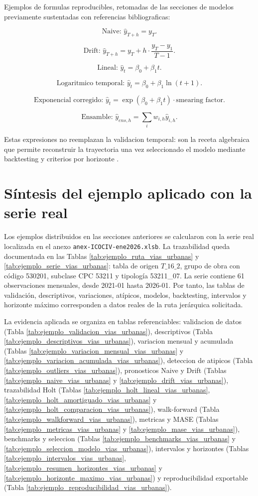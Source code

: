 ﻿\documentclass[12pt,letterpaper]{article}
\newcommand{\yhat}{\hat{y}}
\begin{document}
Ejemplos de formulas reproducibles, retomadas de las secciones de modelos previamente sustentadas con referencias bibliograficas:

\[
\text{Naive: }\yhat_{T+h}=y_T.
\]

\[
\text{Drift: }\yhat_{T+h}=y_T+h\cdot\frac{y_T-y_1}{T-1}.
\]

\[
\text{Lineal: }\yhat_t=\beta_0+\beta_1 t.
\]

\[
\text{Logaritmico temporal: }\yhat_t=\beta_0+\beta_1\ln(t+1).
\]

\[
\text{Exponencial corregido: }\yhat_t=\exp(\beta_0+\beta_1t)\cdot \text{smearing factor}.
\]

\[
\text{Ensamble: }\yhat_{ens,h}=\sum_i w_{i,h}\yhat_{i,h}.
\]

Estas expresiones no reemplazan la validacion temporal: son la receta algebraica que permite reconstruir la trayectoria una vez seleccionado el modelo mediante backtesting y criterios por horizonte \citep{tashman2000,hyndman2021fpp3}.



\section{Síntesis del ejemplo aplicado con la serie real}

Los ejemplos distribuidos en las secciones anteriores se calcularon con la serie real localizada en el anexo \texttt{anex-ICOCIV-ene2026.xlsb}. La trazabilidad queda documentada en las Tablas \ref{tab:ejemplo_ruta_vias_urbanas} y \ref{tab:ejemplo_serie_vias_urbanas}: tabla de origen \(T\_16\_2\), grupo de obra con código 530201, subclase CPC 53211 y tipología 53211\_07. La serie contiene 61 observaciones mensuales, desde 2021-01 hasta 2026-01. Por tanto, las tablas de validación, descriptivos, variaciones, atípicos, modelos, backtesting, intervalos y horizonte máximo corresponden a datos reales de la ruta jerárquica solicitada.

La evidencia aplicada se organiza en tablas referenciables: validacion de datos (Tabla \ref{tab:ejemplo_validacion_vias_urbanas}), descriptivos (Tabla \ref{tab:ejemplo_descriptivos_vias_urbanas}), variacion mensual y acumulada (Tablas \ref{tab:ejemplo_variacion_mensual_vias_urbanas} y \ref{tab:ejemplo_variacion_acumulada_vias_urbanas}), deteccion de atipicos (Tabla \ref{tab:ejemplo_outliers_vias_urbanas}), pronosticos Naive y Drift (Tablas \ref{tab:ejemplo_naive_vias_urbanas} y \ref{tab:ejemplo_drift_vias_urbanas}), trazabilidad Holt (Tablas \ref{tab:ejemplo_holt_lineal_vias_urbanas}, \ref{tab:ejemplo_holt_amortiguado_vias_urbanas} y \ref{tab:ejemplo_holt_comparacion_vias_urbanas}), walk-forward (Tabla \ref{tab:ejemplo_walkforward_vias_urbanas}), metricas y MASE (Tablas \ref{tab:ejemplo_metricas_vias_urbanas} y \ref{tab:ejemplo_mase_vias_urbanas}), benchmarks y seleccion (Tablas \ref{tab:ejemplo_benchmarks_vias_urbanas} y \ref{tab:ejemplo_seleccion_modelo_vias_urbanas}), intervalos y horizontes (Tablas \ref{tab:ejemplo_intervalos_vias_urbanas}, \ref{tab:ejemplo_resumen_horizontes_vias_urbanas} y \ref{tab:ejemplo_horizonte_maximo_vias_urbanas}) y reproducibilidad exportable (Tabla \ref{tab:ejemplo_reproducibilidad_vias_urbanas}).
\end{document}
